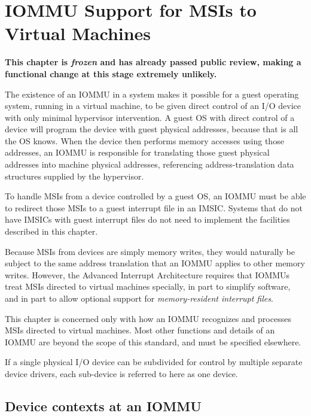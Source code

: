 
\chapter{IOMMU Support for MSIs to Virtual Machines}
\label{ch:IOMMU}

\textbf{%
This chapter is \emph{frozen} and has already passed public review,
making a functional change at this stage extremely unlikely.%
}
\bigskip

The existence of an \mbox{IOMMU} in a system makes it possible for a guest
operating system, running in a virtual machine, to be given direct
control of an I/O device with only minimal hypervisor intervention.
A guest OS with direct control of a device will program the device with
guest physical addresses, because that is all the OS knows.
When the device then performs memory accesses using those addresses, an
\mbox{IOMMU} is responsible for translating those guest physical addresses
into machine physical addresses, referencing address-translation data
structures supplied by the hypervisor.

To handle MSIs from a device controlled by a guest OS, an \mbox{IOMMU} must
be able to redirect those MSIs to a guest interrupt file in an IMSIC.
Systems that do not have IMSICs with guest interrupt files do not need
to implement the facilities described in this chapter.

Because MSIs from devices are simply memory writes, they would
naturally be subject to the same address translation that an \mbox{IOMMU}
applies to other memory writes.
However, the Advanced Interrupt Architecture requires that \mbox{IOMMU}s
treat MSIs directed to virtual machines specially, in part to
simplify software, and in part to allow optional support for
\emph{memory-resident interrupt files}.

This chapter is concerned only with how an \mbox{IOMMU} recognizes and
processes MSIs directed to virtual machines.
Most other functions and details of an \mbox{IOMMU} are beyond the scope of
this standard, and must be specified elsewhere.

If a single physical I/O device can be subdivided for
control by multiple separate device drivers,
each sub-device is referred to here as one device.

\section{Device contexts at an IOMMU}
\label{sec:IOMMU-deviceContexts}

